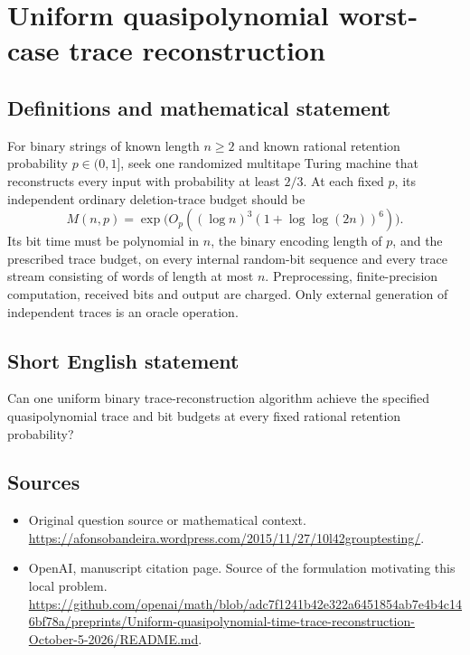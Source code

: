 \documentclass[11pt]{article}
\begin{document}
\section*{Uniform quasipolynomial worst-case trace reconstruction}\label{statement}
\subsection{Definitions and mathematical statement}
For binary strings of known length $n\ge2$ and known rational retention probability $p\in(0,1]$, seek one randomized multitape Turing machine that reconstructs every input with probability at least $2/3$. At each fixed $p$, its independent ordinary deletion-trace budget should be
\[
 M(n,p)=\exp\bigl(O_p((\log n)^3(1+\log\log(2n))^6)\bigr).
\]
Its bit time must be polynomial in $n$, the binary encoding length of $p$, and the prescribed trace budget, on every internal random-bit sequence and every trace stream consisting of words of length at most $n$. Preprocessing, finite-precision computation, received bits and output are charged. Only external generation of independent traces is an oracle operation.

\subsection{Short English statement}
Can one uniform binary trace-reconstruction algorithm achieve the specified quasipolynomial trace and bit budgets at every fixed rational retention probability?

\subsection{Sources}
\begin{itemize}
\item[S1] Original question source or mathematical context.
\url{https://afonsobandeira.wordpress.com/2015/11/27/10l42grouptesting/}.
\item[S2] OpenAI, manuscript citation page. Source of the formulation motivating this local problem.
\url{https://github.com/openai/math/blob/adc7f1241b42e322a6451854ab7e4b4c146bf78a/preprints/Uniform-quasipolynomial-time-trace-reconstruction-October-5-2026/README.md}.
\end{itemize}
\end{document}
